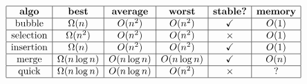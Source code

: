 \documentclass[10pt, landscape]{article}
\begin{document}
\hrulefill \\

\begin{center}
    $
    \begin{array}{| c | c | c | c | c | c |}
        \hline\textbf{algo} & \textbf{best} & \textbf{average} & \textbf{worst} & \textbf{stable?} & \textbf{memory}

        \\\hline\text{bubble} & \Omega(n) & O(n^2) & O(n^2) & \checkmark & O(1)
        
        \\\hline\text{selection} & \Omega(n^2) & O(n^2) & O(n^2) & \times & O(1)
        
        \\\hline\text{insertion} & \Omega(n) & O(n^2) & O(n^2) & \checkmark & O(1)
        
        \\\hline\text{merge} & \Omega(n\log n) & O(n\log n) & O(n\log n) & \checkmark & O(n)
        
        \\\hline\text{quick} & \Omega(n\log n) & O(n\log n) & O(n^2) & \times & ?
        \\\hline
    \end{array} 
    $
\end{center}
\begin{center}
\end{center}
\end{document}
